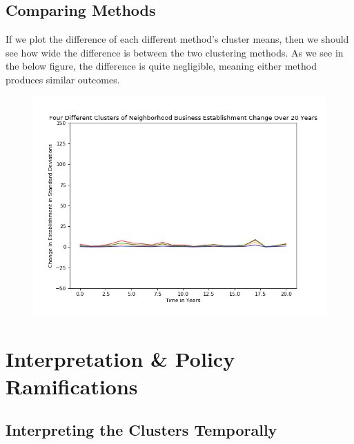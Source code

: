\documentclass[letter, 11pt]{article} %
\begin{document}
		\pagebreak
	
	\subsection{Comparing Methods}
	
		If we plot the difference of each different method's cluster means, then we should see how wide the difference is between the two clustering methods. As we see in the below figure, the difference is quite negligible, meaning either method produces similar outcomes.
	
		\begin{figure}[H]
			\centering
			\includegraphics[width=\textwidth]{difference.png}
		\end{figure}	

		\pagebreak
		



\section{Interpretation \& Policy Ramifications}

	\subsection{Interpreting the Clusters Temporally}
	
\end{document}
